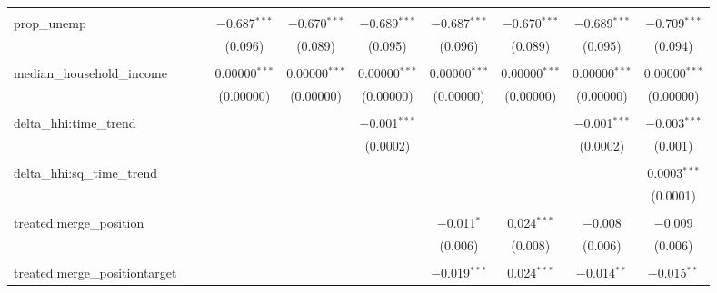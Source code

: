 \begin{table}[H]
{\begin{tabular}{@{\extracolsep{5pt}}lccccccccc}
   & & & & & & & & & \\  

  prop\_unemp &  &  & $-$0.687$^{***}$ & $-$0.670$^{***}$ & $-$0.689$^{***}$ & $-$0.687$^{***}$ & $-$0.670$^{***}$ & $-$0.689$^{***}$ & $-$0.709$^{***}$ \\  

   &  &  & (0.096) & (0.089) & (0.095) & (0.096) & (0.089) & (0.095) & (0.094) \\  

   & & & & & & & & & \\  

  median\_household\_income &  &  & 0.00000$^{***}$ & 0.00000$^{***}$ & 0.00000$^{***}$ & 0.00000$^{***}$ & 0.00000$^{***}$ & 0.00000$^{***}$ & 0.00000$^{***}$ \\  

   &  &  & (0.00000) & (0.00000) & (0.00000) & (0.00000) & (0.00000) & (0.00000) & (0.00000) \\  

   & & & & & & & & & \\  

  delta\_hhi:time\_trend &  &  &  &  & $-$0.001$^{***}$ &  &  & $-$0.001$^{***}$ & $-$0.003$^{***}$ \\  

   &  &  &  &  & (0.0002) &  &  & (0.0002) & (0.001) \\  

   & & & & & & & & & \\  

  delta\_hhi:sq\_time\_trend &  &  &  &  &  &  &  &  & 0.0003$^{***}$ \\  

   &  &  &  &  &  &  &  &  & (0.0001) \\  

   & & & & & & & & & \\  

  treated:merge\_position &  &  &  &  &  & $-$0.011$^{*}$ & 0.024$^{***}$ & $-$0.008 & $-$0.009 \\  

   &  &  &  &  &  & (0.006) & (0.008) & (0.006) & (0.006) \\  

   & & & & & & & & & \\  

  treated:merge\_positiontarget &  &  &  &  &  & $-$0.019$^{***}$ & 0.024$^{***}$ & $-$0.014$^{**}$ & $-$0.015$^{**}$ \\  


\end{tabular}}
\end{table}
